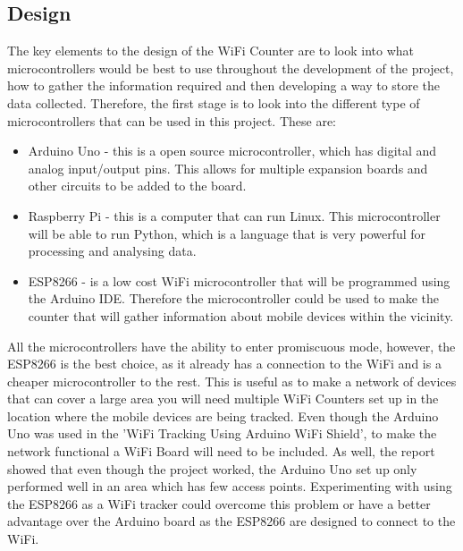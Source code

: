 \documentclass{report}
\begin{document}
\subsection{Design}
The key elements to the design of the WiFi Counter are to look into what microcontrollers would be best to use throughout the development of the project, how to gather the information required and then developing a way to store the data collected. Therefore, the first stage is to look into the different type of microcontrollers that can be used in this project. These are:
\begin{itemize}
    \item Arduino Uno \cite{AduinoUno} - this is a open source microcontroller, which has digital and analog input/output pins. This allows for multiple expansion boards and other circuits to be added to the board.
    \item Raspberry Pi\cite{RaspberryPi} -  this is a computer that can run Linux. This microcontroller will be able to run Python, which is a language that is very powerful for processing and analysing data\cite{Python}.
    \item ESP8266\cite{ESP8266} - is a low cost WiFi microcontroller that will be programmed using the Arduino IDE\cite{ArdinoIDE}. Therefore the microcontroller could be used to make the counter that will gather information about mobile devices within the vicinity.
\end{itemize}{}
All the microcontrollers have the ability to enter promiscuous mode, however, the ESP8266 is the best choice, as it already has a connection to the WiFi and is a cheaper microcontroller to the rest. This is useful as to make a network of devices that can cover a large area you will need multiple WiFi Counters set up in the location where the mobile devices are being tracked. Even though the Arduino Uno was used in the 'WiFi Tracking Using Arduino WiFi Shield'\cite{ProtrackingArduino}, to make the network functional a  WiFi Board will need to be included. As well, the report showed that even though the project worked, the Arduino Uno set up only performed well in an area which has few access points. Experimenting with using the ESP8266 as a WiFi tracker could overcome this problem or have a better advantage over the Arduino board as the ESP8266 are designed to connect to the WiFi. \\ \newline
\end{document}
